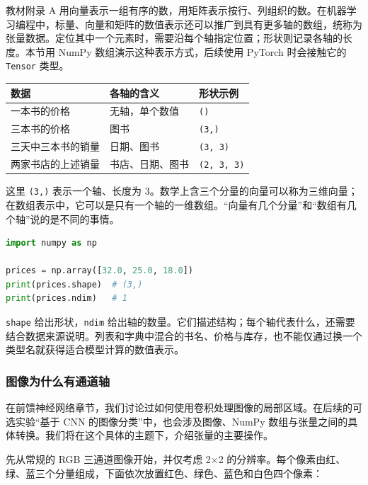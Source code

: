 \documentclass[UTF8,a4paper,11pt,fontset=fandol]{ctexart}
\providecommand{\passthrough}[1]{#1}
\begin{document}
教材附录 A 用向量表示一组有序的数，用矩阵表示按行、列组织的数。在机器学习编程中，标量、向量和矩阵的数值表示还可以推广到具有更多轴的数组，统称为张量数据。定位其中一个元素时，需要沿每个轴指定位置；形状则记录各轴的长度。本节用 NumPy 数组演示这种表示方式，后续使用 PyTorch 时会接触它的 \passthrough{\lstinline!Tensor!} 类型。

\begin{longtable}[]{@{}lll@{}}
\toprule\noalign{}
数据 & 各轴的含义 & 形状示例 \\
\midrule\noalign{}
\endhead
\bottomrule\noalign{}
\endlastfoot
一本书的价格 & 无轴，单个数值 & \passthrough{\lstinline!()!} \\
三本书的价格 & 图书 & \passthrough{\lstinline!(3,)!} \\
三天中三本书的销量 & 日期、图书 & \passthrough{\lstinline!(3, 3)!} \\
两家书店的上述销量 & 书店、日期、图书 & \passthrough{\lstinline!(2, 3, 3)!} \\
\end{longtable}

这里 \passthrough{\lstinline!(3,)!} 表示一个轴、长度为 3。数学上含三个分量的向量可以称为三维向量；在数组表示中，它可以是只有一个轴的一维数组。``向量有几个分量''和``数组有几个轴''说的是不同的事情。

\begin{lstlisting}[language=Python]
import numpy as np

prices = np.array([32.0, 25.0, 18.0])
print(prices.shape)  # (3,)
print(prices.ndim)   # 1
\end{lstlisting}

\passthrough{\lstinline!shape!} 给出形状，\passthrough{\lstinline!ndim!} 给出轴的数量。它们描述结构；每个轴代表什么，还需要结合数据来源说明。列表和字典中混合的书名、价格与库存，也不能仅通过换一个类型名就获得适合模型计算的数值表示。

\clearpage

\subsubsection{图像为什么有通道轴}\label{ux56feux50cfux4e3aux4ec0ux4e48ux6709ux901aux9053ux8f74}

在前馈神经网络章节，我们讨论过如何使用卷积处理图像的局部区域。在后续的可选实验``基于 CNN 的图像分类''中，也会涉及图像、NumPy 数组与张量之间的具体转换。我们将在这个具体的主题下，介绍张量的主要操作。

先从常规的 RGB 三通道图像开始，并仅考虑 2×2 的分辨率。每个像素由红、绿、蓝三个分量组成，下面依次放置红色、绿色、蓝色和白色四个像素：
\end{document}
